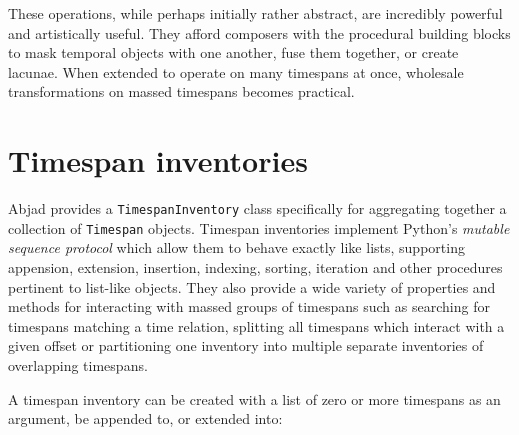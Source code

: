 \noindent These operations, while perhaps initially rather abstract, are
incredibly powerful and artistically useful. They afford composers with the
procedural building blocks to mask temporal objects with one another, fuse them
together, or create lacunae. When extended to operate on many timespans at
once, wholesale transformations on massed timespans becomes practical.

\section{Timespan inventories}

Abjad provides a \texttt{TimespanInventory} class specifically for aggregating
together a collection of \texttt{Timespan} objects. Timespan inventories
implement Python's \emph{mutable sequence protocol} which allow them to behave
exactly like lists, supporting appension, extension, insertion, indexing,
sorting, iteration and other procedures pertinent to list-like objects. They
also provide a wide variety of properties and methods for interacting with
massed groups of timespans such as searching for timespans matching a time
relation, splitting all timespans which interact with a given offset or
partitioning one inventory into multiple separate inventories of overlapping
timespans.

A timespan inventory can be created with a list of zero or more timespans as an
argument, be appended to, or extended into:

\begin{comment}
<abjad>
timespan_inventory = timespantools.TimespanInventory([
    timespantools.Timespan(0, 16),
    ])
timespan_inventory.append(timespantools.Timespan(5, 12))
timespan_inventory.extend([
    timespantools.Timespan(-2, 8),
    timespantools.Timespan(15, 20),
    ])
print(format(timespan_inventory))
</abjad>
\end{comment}

